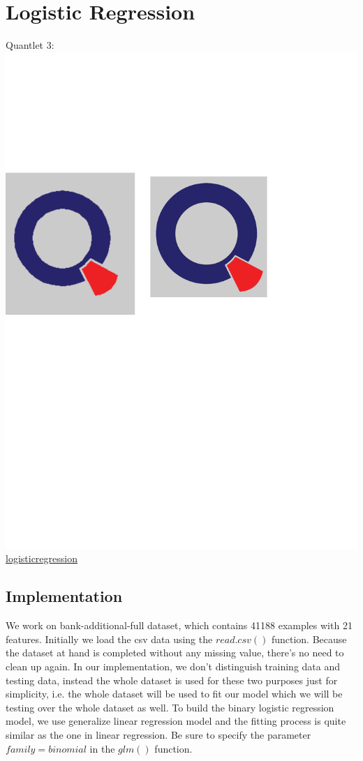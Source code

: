 \documentclass[12pt, a4paper, bibliography=totoc, english]{scrartcl}
\begin{document}
\section{Logistic Regression}
Quantlet 3:\includegraphics[scale=0.08]{qletlogo}
\textcolor{blue}{\href{https://github.com/JingyiLiu3136/MLFBM/tree/master/logisticregression}{logisticregression}}\\

\subsection{Implementation}

We work on bank-additional-full dataset, which contains 41188 examples with 21 features. Initially we load the csv data using the $read.csv()$ function. Because the dataset at hand is completed without any missing value, there’s no need to clean up again.
In our implementation, we don’t distinguish training data and testing data, instead the whole dataset is used for these two purposes just for simplicity, i.e. the whole dataset will be used to fit our model which we will be testing over the whole dataset as well.
To build the binary logistic regression model, we use generalize linear regression model and the fitting process is quite similar as the one in linear regression. Be sure to specify the parameter $family=binomial$ in the $glm()$ function. 
\end{document}
